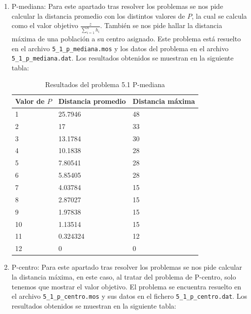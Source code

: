 \documentclass[a4paper,11pt]{article}
\begin{document}
\begin{enumerate}
\item P-mediana: Para este apartado tras resolver los problemas se nos pide calcular la distancia promedio con los distintos valores de ${P}$, la cual se calcula como el valor objetivo ${\frac{z}{\sum_{i=1}^{n}{h_{i}}}}$. También se nos pide hallar la distancia máxima de una población a su centro asignado. Este problema está resuelto en el archivo \texttt{5\_1\_p\_mediana.mos} y los datos del problema en el archivo \texttt{5\_1\_p\_mediana.dat}. Los resultados obtenidos se muestran en la siguiente tabla:

\begin{table}[!htbp]
\label{5.1_p_mediana}
\centering
\begin{tabular}{|l|l|l|}
\hline
Valor de ${P}$	& Distancia promedio  & Distancia máxima	\\ \hline
1	& 25.7946	& 48	\\ \hline
2	& 17		& 33	\\ \hline
3	& 13.1784	& 30	\\ \hline
4	& 10.1838	& 28	\\ \hline
5	& 7.80541	& 28	\\ \hline
6	& 5.85405	& 28	\\ \hline
7	& 4.03784	& 15	\\ \hline
8	& 2.87027	& 15	\\ \hline
9	& 1.97838	& 15	\\ \hline
10	& 1.13514	& 15	\\ \hline
11	& 0.324324	& 12	\\ \hline
12	& 0			& 0		\\ \hline
\end{tabular}
\caption{Resultados del problema 5.1 P-mediana}
\end{table}

\newpage
\item P-centro: Para este apartado tras resolver los problemas se nos pide calcular la distancia máxima, en este caso, al tratar del problema de P-centro, solo tenemos que mostrar el valor objetivo. El problema se encuentra resuelto en el archivo \texttt{5\_1\_p\_centro.mos} y sus datos en el fichero \texttt{5\_1\_p\_centro.dat}. Los resultados obtenidos se muestran en la siguiente tabla:


\end{enumerate}
\end{document}
